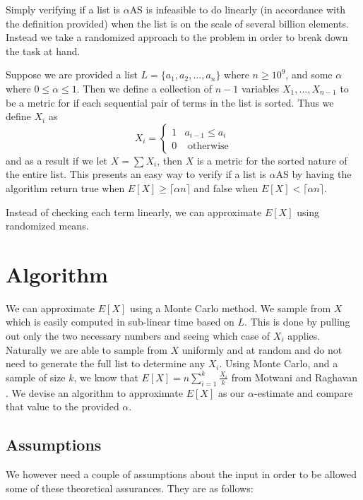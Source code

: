 \documentclass[11pt]{article}
\begin{document}
Simply verifying if a list is $\alpha$AS is infeasible to do linearly (in accordance with the definition provided) when the list is on the scale of several billion elements. Instead we take a randomized approach to the problem in order to break down the task at hand. 

Suppose we are provided a list $L = \{a_1, a_2, ..., a_n\}$ where $n \geq 10^9$, and some $\alpha$ where $0 \leq \alpha \leq 1$. Then we define a collection of $n-1$ variables $X_1, ..., X_{n-1}$ to be a metric for if each sequential pair of terms in the list is sorted. Thus we define $X_i$ as
$$X_i = 
\begin{cases}
	1 & a_{i-1} \leq a_i \\
	0 & \text{ otherwise}
\end{cases}$$
and as a result if we let $X = \sum X_i$, then $X$ is a metric for the sorted nature of the entire list. This presents an easy way to verify if a list is $\alpha$AS by having the algorithm return true when $E[X] \geq \lceil \alpha n \rceil$ and false when $E[X] < \lceil \alpha n \rceil$.

Instead of checking each term linearly, we can approximate $E[X]$ using randomized means. 

\section{Algorithm}

We can approximate $E[X]$ using a Monte Carlo method. We sample from $X$ which is easily computed in sub-linear time based on $L$. This is done by pulling out only the two necessary numbers and seeing which case of $X_i$ applies. Naturally we are able to sample from $X$ uniformly and at random and do not need to generate the full list to determine any $X_i$. Using Monte Carlo, and a sample of size $k$, we know that $E[X] = n \sum\limits^k_{i=1} \frac{X_i}{k}$ from Motwani and Raghavan \cite{textbook}. We devise an algorithm to approximate $E[X]$ as our $\alpha$-estimate and compare that value to the provided $\alpha$. 

\subsection{Assumptions}

We however need a couple of assumptions about the input in order to be allowed some of these theoretical assurances. They are as follows:
\end{document}
